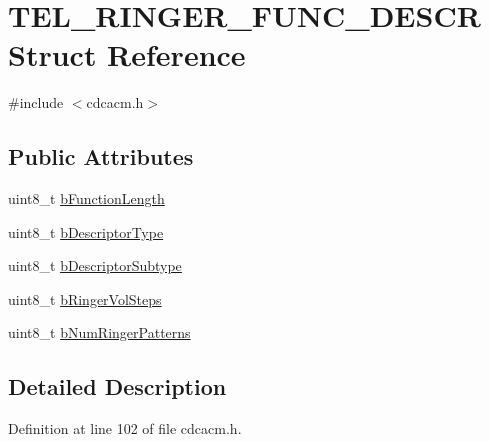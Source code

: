 \hypertarget{struct_t_e_l___r_i_n_g_e_r___f_u_n_c___d_e_s_c_r}{\section{\-T\-E\-L\-\_\-\-R\-I\-N\-G\-E\-R\-\_\-\-F\-U\-N\-C\-\_\-\-D\-E\-S\-C\-R \-Struct \-Reference}
\label{struct_t_e_l___r_i_n_g_e_r___f_u_n_c___d_e_s_c_r}
}


{\ttfamily \#include $<$cdcacm.\-h$>$}

\subsection*{\-Public \-Attributes}
\begin{DoxyCompactItemize}
\item 
uint8\-\_\-t \hyperlink{struct_t_e_l___r_i_n_g_e_r___f_u_n_c___d_e_s_c_r_afac33a06771f8b063a8330849cb19386}{b\-Function\-Length}
\item 
uint8\-\_\-t \hyperlink{struct_t_e_l___r_i_n_g_e_r___f_u_n_c___d_e_s_c_r_ad20f29394df0ec88cd151fa9a5a22579}{b\-Descriptor\-Type}
\item 
uint8\-\_\-t \hyperlink{struct_t_e_l___r_i_n_g_e_r___f_u_n_c___d_e_s_c_r_aeb3343737ca0bc3b869a6c7046b3d2c2}{b\-Descriptor\-Subtype}
\item 
uint8\-\_\-t \hyperlink{struct_t_e_l___r_i_n_g_e_r___f_u_n_c___d_e_s_c_r_afdbb7ff1b60803569e26718685da9196}{b\-Ringer\-Vol\-Steps}
\item 
uint8\-\_\-t \hyperlink{struct_t_e_l___r_i_n_g_e_r___f_u_n_c___d_e_s_c_r_aca65dc577a0dbc13972da9ab26e25918}{b\-Num\-Ringer\-Patterns}
\end{DoxyCompactItemize}


\subsection{\-Detailed \-Description}


\-Definition at line 102 of file cdcacm.\-h.



